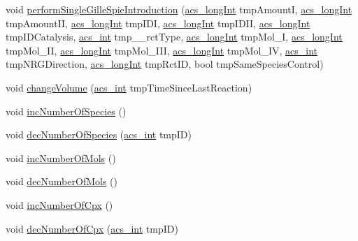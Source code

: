 \begin{DoxyCompactItemize}
\item 
void \hyperlink{classenvironment_a30a0827eed2860d03d5fa5318fcf86b0}{perform\-Single\-Gille\-Spie\-Introduction} (\hyperlink{acs__headers_8h_a19319d75f02db4308bc5c0026d98cd85}{acs\-\_\-long\-Int} tmp\-Amount\-I, \hyperlink{acs__headers_8h_a19319d75f02db4308bc5c0026d98cd85}{acs\-\_\-long\-Int} tmp\-Amount\-I\-I, \hyperlink{acs__headers_8h_a19319d75f02db4308bc5c0026d98cd85}{acs\-\_\-long\-Int} tmp\-I\-D\-I, \hyperlink{acs__headers_8h_a19319d75f02db4308bc5c0026d98cd85}{acs\-\_\-long\-Int} tmp\-I\-D\-I\-I, \hyperlink{acs__headers_8h_a19319d75f02db4308bc5c0026d98cd85}{acs\-\_\-long\-Int} tmp\-I\-D\-Catalysis, \hyperlink{acs__headers_8h_a8d277355641a098190360234e2ebde35}{acs\-\_\-int} tmp\-\_\-\-\_\-rct\-Type, \hyperlink{acs__headers_8h_a19319d75f02db4308bc5c0026d98cd85}{acs\-\_\-long\-Int} tmp\-Mol\-\_\-\-I, \hyperlink{acs__headers_8h_a19319d75f02db4308bc5c0026d98cd85}{acs\-\_\-long\-Int} tmp\-Mol\-\_\-\-I\-I, \hyperlink{acs__headers_8h_a19319d75f02db4308bc5c0026d98cd85}{acs\-\_\-long\-Int} tmp\-Mol\-\_\-\-I\-I\-I, \hyperlink{acs__headers_8h_a19319d75f02db4308bc5c0026d98cd85}{acs\-\_\-long\-Int} tmp\-Mol\-\_\-\-I\-V, \hyperlink{acs__headers_8h_a8d277355641a098190360234e2ebde35}{acs\-\_\-int} tmp\-N\-R\-G\-Direction, \hyperlink{acs__headers_8h_a19319d75f02db4308bc5c0026d98cd85}{acs\-\_\-long\-Int} tmp\-Rct\-I\-D, bool tmp\-Same\-Species\-Control)
\item 
void \hyperlink{classenvironment_a0156a2d7219396e58a930731966b0c66}{change\-Volume} (\hyperlink{acs__headers_8h_a8d277355641a098190360234e2ebde35}{acs\-\_\-int} tmp\-Time\-Since\-Last\-Reaction)
\item 
void \hyperlink{classenvironment_a5c86f93c84f9931640843c38eccb9bf4}{inc\-Number\-Of\-Species} ()
\item 
void \hyperlink{classenvironment_a69a926e0b9bb4f4b29876d0e45b54d84}{dec\-Number\-Of\-Species} (\hyperlink{acs__headers_8h_a8d277355641a098190360234e2ebde35}{acs\-\_\-int} tmp\-I\-D)
\item 
void \hyperlink{classenvironment_ae356db3b6ee374b998e9f041216b4b75}{inc\-Number\-Of\-Mols} ()
\item 
void \hyperlink{classenvironment_af042f7904c92fdd239995bebbab2cf60}{dec\-Number\-Of\-Mols} ()
\item 
void \hyperlink{classenvironment_a69ae530ef6f9298e3ab8304157709404}{inc\-Number\-Of\-Cpx} ()
\item 
void \hyperlink{classenvironment_aadd057e7038269e6fac314a12a3bf334}{dec\-Number\-Of\-Cpx} (\hyperlink{acs__headers_8h_a8d277355641a098190360234e2ebde35}{acs\-\_\-int} tmp\-I\-D)

\end{DoxyCompactItemize}
